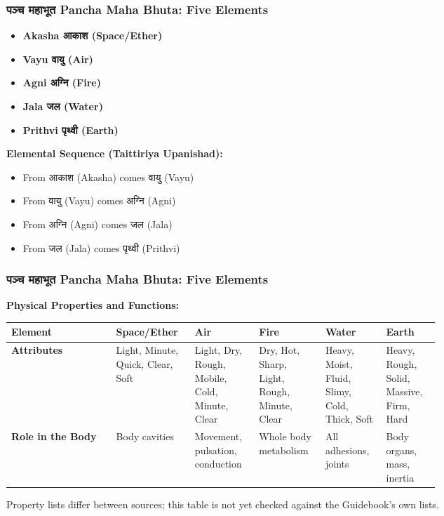 \begin{frame}[fragile]\frametitle{पञ्च  महाभूत  Pancha Maha Bhuta: Five Elements}


    \begin{itemize}
        \item \textbf{Akasha आकाश  (Space/Ether)}
        \item \textbf{Vayu वायु  (Air)}
        \item \textbf{Agni अग्नि (Fire)}
        \item \textbf{Jala जल (Water)}
        \item \textbf{Prithvi पृथ्वी (Earth)}
    \end{itemize}
	
    \textbf{Elemental Sequence (Taittiriya Upanishad):}
	
    \begin{itemize}
        \item From आकाश (Akasha) comes वायु (Vayu)
        \item From वायु (Vayu) comes अग्नि (Agni)
        \item From अग्नि (Agni) comes जल (Jala)
        \item From जल (Jala) comes पृथ्वी (Prithvi)
    \end{itemize}
	
\end{frame}

\begin{frame}[fragile]\frametitle{पञ्च  महाभूत   Pancha Maha Bhuta: Five Elements}

    \textbf{Physical Properties and Functions:}
	
	
        \begin{tabular}{|p{0.21\linewidth}|p{0.1\linewidth}|p{0.1\linewidth}|p{0.1\linewidth}|p{0.1\linewidth}|p{0.1\linewidth}|}
    \hline
    \textbf{Element} & \textbf{Space/Ether} & \textbf{Air} & \textbf{Fire} & \textbf{Water} & \textbf{Earth} \\
    \hline
    \textbf{Attributes} & Light, Minute, Quick, Clear, Soft & Light, Dry, Rough, Mobile, Cold, Minute, Clear & Dry, Hot, Sharp, Light, Rough, Minute, Clear & Heavy, Moist, Fluid, Slimy, Cold, Thick, Soft & Heavy, Rough, Solid, Massive, Firm, Hard \\
    \hline
    \textbf{Role in the Body} & Body cavities & Movement, pulsation, conduction & Whole body metabolism & All adhesions, joints & Body organs, mass, inertia \\
    \hline
    \end{tabular}

    {\tiny Property lists differ between sources; this table is not yet checked against the Guidebook's own lists.}

\end{frame}


